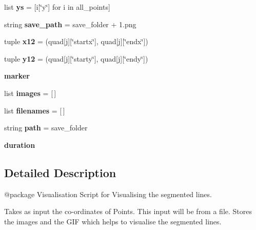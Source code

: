 \begin{DoxyCompactItemize}
\item 
\mbox{\label{namespaceviz_aba10e6cb35ce6bb5bcda964ee5424709}} 
list {\bfseries ys} = \mbox{[}i\mbox{[}\char`\"{}y\char`\"{}\mbox{]} for i in all\+\_\+points\mbox{]}
\item 
\mbox{\label{namespaceviz_ad500652a6dbdadf872bcc16c06a7f1f2}} 
string {\bfseries save\+\_\+path} = save\+\_\+folder + \textquotesingle{}1.png\textquotesingle{}
\item 
\mbox{\label{namespaceviz_a5154b62dc4f27dd696be2eb29e190510}} 
tuple {\bfseries x12} = (quad\mbox{[}j\mbox{]}\mbox{[}\char`\"{}startx\char`\"{}\mbox{]}, quad\mbox{[}j\mbox{]}\mbox{[}\char`\"{}endx\char`\"{}\mbox{]})
\item 
\mbox{\label{namespaceviz_a90b8e0262d8da637b8c73c32436c463f}} 
tuple {\bfseries y12} = (quad\mbox{[}j\mbox{]}\mbox{[}\char`\"{}starty\char`\"{}\mbox{]}, quad\mbox{[}j\mbox{]}\mbox{[}\char`\"{}endy\char`\"{}\mbox{]})
\item 
\mbox{\label{namespaceviz_a2775352cd2f8e39030d46cccdd6c5bec}} 
{\bfseries marker}
\item 
\mbox{\label{namespaceviz_ae10009cd81d9cc163a3c8be90b7fba9e}} 
list {\bfseries images} = \mbox{[}$\,$\mbox{]}
\item 
\mbox{\label{namespaceviz_a6e3b1ef282af414dc603e69de148d85d}} 
list {\bfseries filenames} = \mbox{[}$\,$\mbox{]}
\item 
\mbox{\label{namespaceviz_a71f94f80afeaf328e723219337010411}} 
string {\bfseries path} = save\+\_\+folder
\item 
\mbox{\label{namespaceviz_afb8dadc1612617718e8c0a507596b2d6}} 
{\bfseries duration}
\end{DoxyCompactItemize}


\subsection{Detailed Description}
\begin{DoxyVerb}@package Visualisation
Script for Visualising the segmented lines.

Takes as input the co-ordinates of Points. This input will be from a file.
Stores the images and the GIF which helps to visualise the segmented lines.
\end{DoxyVerb}
 